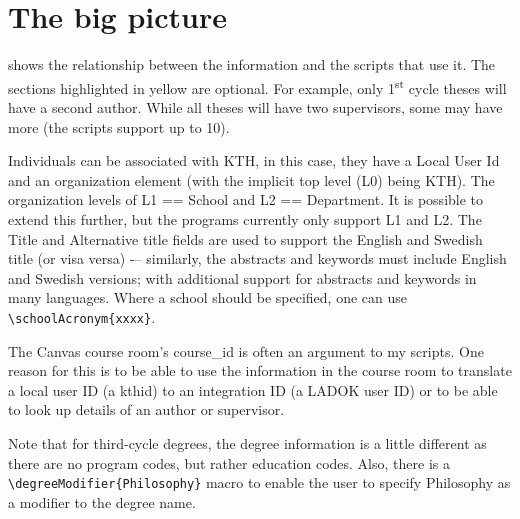\documentclass[12pt, twoside]{article}
\begin{document}

\section{The big picture}
\label{sec:TheBiGPicture}

 shows the relationship between the information and the scripts that use it. The sections highlighted in yellow are optional. For example, only 1\textsuperscript{st} cycle theses will have a second author. While all theses will have two supervisors, some may have more (the scripts support up to 10).

Individuals can be associated with \gls{KTH}, in this case, they have a Local User Id and an organization element (with the implicit top level (L0) being \gls{KTH}). The organization levels of L1 == School and L2 == Department. It is possible to extend this further, but the programs currently only support L1 and L2. The Title and Alternative title fields are used to support the English and Swedish title (or visa versa) -– similarly, the abstracts and keywords must include English and Swedish versions; with additional support for abstracts and keywords in many languages. Where a school should be specified, one can use \texttt{\textbackslash schoolAcronym\{xxxx\}}.

The Canvas course room’s course\_id is often an argument to my scripts. One reason for this is to be able to use the information in the course room to translate a local user ID (\ie a kthid) to an integration ID (\ie a LADOK user ID) or to be able to look up details of an author or supervisor.

Note that for third-cycle degrees, the degree information is a little different as there are no program codes, but rather education codes. Also, there is a \texttt{\textbackslash degreeModifier\{Philosophy\}} macro to enable the user to specify Philosophy as a modifier to the degree name.
\end{document}
